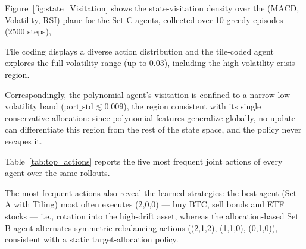 \documentclass[pdflatex,sn-mathphys-num]{sn-jnl}
\begin{document}
Figure~\ref{fig:state_Visitation} shows the state-visitation density over 
the (MACD, Volatility, RSI) plane for the Set C agents, 
collected over 10 greedy episodes (2500 steps), 

Tile coding displays a diverse action distribution and the tile-coded agent 
explores the full volatility range (up to $0.03$), including the high-volatility crisis region. 

Correspondingly, the polynomial agent's visitation is confined to a narrow low-volatility 
band ($\mathrm{port\_std} \lesssim 0.009$), the region consistent with its single conservative allocation: 
since polynomial features generalize globally, no update can differentiate this region from the rest of the state space, 
and the policy never escapes it. 

Table~\ref{tab:top_actions} reports the five most frequent joint actions of every agent over the same rollouts. 

The most frequent actions also reveal the learned strategies: the best agent (Set A with Tiling) 
most often executes (2,0,0) --- buy BTC, sell bonds and ETF stocks --- i.e., rotation into the high-drift asset, 
whereas the allocation-based Set B agent alternates symmetric rebalancing actions ((2,1,2), (1,1,0), (0,1,0)), consistent with a static target-allocation policy.
\end{document}
